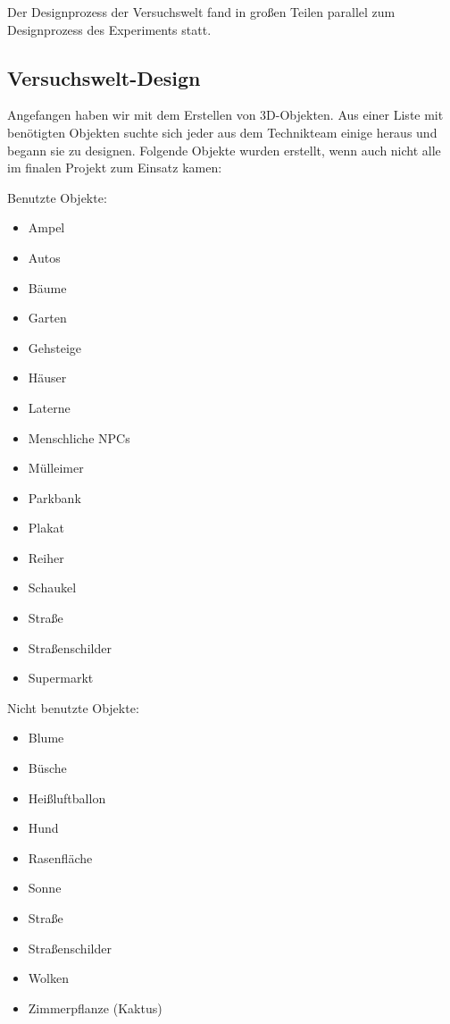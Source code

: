 \documentclass{Bericht}
\begin{document}
		Der Designprozess der Versuchswelt fand in großen Teilen parallel zum Designprozess des Experiments statt. 
	
	\subsection{Versuchswelt-Design} %
		Angefangen haben wir mit dem Erstellen von 3D-Objekten. Aus einer Liste mit benötigten Objekten suchte sich jeder aus dem Technikteam einige heraus und begann sie zu designen. Folgende Objekte wurden erstellt, wenn auch nicht alle im finalen Projekt zum Einsatz kamen:

	\begin{minipage}[t]{0.5\textwidth}
	\vspace{1mm}
		Benutzte Objekte:
		\begin{itemize}
			\setlength{\itemsep}{0em}
			\item Ampel
			\item Autos
			\item Bäume
			\item Garten
			\item Gehsteige
			\item Häuser
			\item Laterne
			\item Menschliche NPCs
			\item Mülleimer
			\item Parkbank
			\item Plakat
			\item Reiher
			\item Schaukel
			\item Straße
			\item Straßenschilder
			\item Supermarkt
		\end{itemize}
	\vspace{1mm}
	\end{minipage}
	\begin{minipage}[t]{0.5\textwidth}
	\vspace{1mm}
		Nicht benutzte Objekte:
		\begin{itemize}
			\setlength{\itemsep}{0em}
			\item Blume
			\item Büsche
			\item Heißluftballon
			\item Hund
			\item Rasenfläche
			\item Sonne
			\item Straße
			\item Straßenschilder
			\item Wolken
			\item Zimmerpflanze (Kaktus)
		\end{itemize}
	\vspace{1mm}
	\end{minipage}
	
\end{document}
